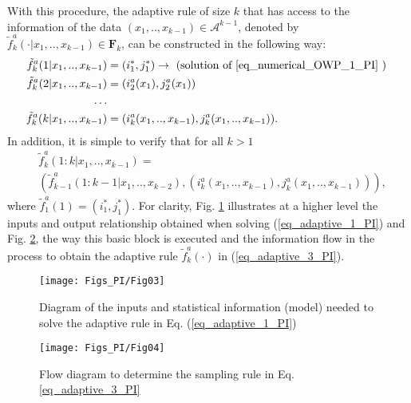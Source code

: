 {
With this procedure,  the adaptive rule of size $k$ that has access to the information of the data  $(x_1,..,x_{k-1})\in \mathcal{A}^{k-1}$, denoted by $\tilde{f}^a_k(\cdot | x_1,..,x_{k-1})\in \mathbf{F}_k$, can be constructed in the following way:
\begin{align} \label{eq_adaptive_2_PI}
	\tilde{f}^a_k(1|x_1,..,x_{k-1})&=(i^*_1,j^*_1)   \rightarrow     \text{ (solution of \eqref{eq_numerical_OWP_1_PI} ) }\nonumber\\ %
	\tilde{f}^a_k(2|x_1,..,x_{k-1})&= (i^a_2(x_1),j^a_2(x_1))\nonumber\\
	\ldots \nonumber\\
	\tilde{f}^a_k(k|x_1,..,x_{k-1})&= (i^a_k(x_1,..,x_{k-1}),j^a_k(x_1,..,x_{k-1})). 
\end{align}
In addition, it is simple to verify that for all $k>1$
\begin{align} \label{eq_adaptive_3_PI}
&\tilde{f}^a_k(1:k | x_1,..,x_{k-1})=\nonumber\\
&(\tilde{f}^a_{k-1}(1:k-1 | x_1,..,x_{k-2}), (i^a_k(x_1,..,x_{k-1}),j^a_k(x_1,..,x_{k-1}))),
\end{align}
where $\tilde{f}^a_{1}(1)=(i^*_1,j^*_1)$. For clarity, Fig. \ref{fig:diagAda_1_PI} illustrates at a higher level the inputs and output relationship obtained when solving (\ref{eq_adaptive_1_PI}) and Fig. \ref{fig:diagAda_2_PI}, the way this basic block is executed and the information flow in the process to obtain the adaptive rule $\tilde{f}^a_k(\cdot)$ in (\ref{eq_adaptive_3_PI}).
}

\begin{figure}[!ht]
    \centering
    \texttt{[image: Figs\_PI/Fig03]}
	\caption[Diagram to solve the adaptive rule in Eq. (\ref{eq_adaptive_1_PI})]{\label{fig:diagAda_1_PI} { Diagram of the inputs and statistical information (model) needed to solve the adaptive rule in Eq. (\ref{eq_adaptive_1_PI}) } }
\end{figure}

\begin{figure}[!ht]
    \centering
    \texttt{[image: Figs\_PI/Fig04]}
	\caption{\label{fig:diagAda_2_PI} { Flow diagram to determine the sampling rule in Eq. \ref{eq_adaptive_3_PI} } }  
\end{figure}




